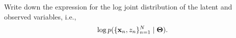 Write down the expression for the log joint distribution of the latent and observed variables, i.e., 
\begin{align*}
    \operatorname{log}p(\{\bold{x}_n, z_n\}_{n=1}^{N} \mid \bold{\Theta}).
\end{align*}
